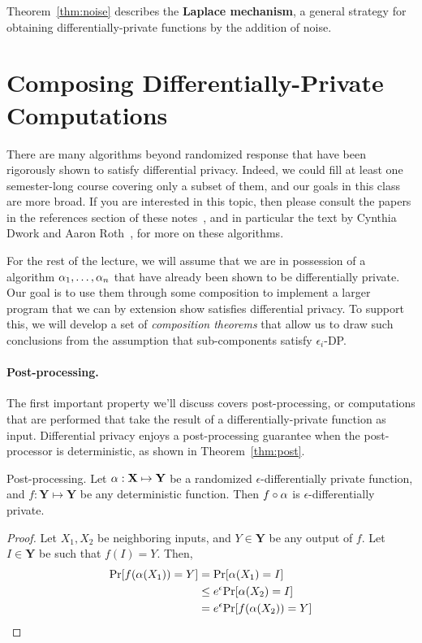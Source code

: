 \documentclass[11pt,twoside]{scrartcl}
\begin{document}
Theorem~\ref{thm:noise} describes the \textbf{Laplace mechanism}, a general strategy for obtaining differentially-private functions by the addition of noise.

\section{Composing Differentially-Private Computations}

There are many algorithms beyond randomized response that have been rigorously shown to satisfy differential privacy. Indeed, we could fill at least one semester-long course covering only a subset of them, and our goals in this class are more broad. If you are interested in this topic, then please consult the papers in the references section of these notes~\cite{Chaudhuri2011,ErlingssonKP14,McSherry2009}, and in particular the text by Cynthia Dwork and Aaron Roth~\cite{Dwork2014}, for more on these algorithms.

For the rest of the lecture, we will assume that we are in possession of a algorithm $\alpha_1, \ldots, \alpha_n$ that have already been shown to be differentially private. Our goal is to use them through some composition to implement a larger program that we can by extension show satisfies differential privacy. To support this, we will develop a set of \emph{composition theorems} that allow us to draw such conclusions from the assumption that sub-components satisfy $\epsilon_i$-DP.

\paragraph{Post-processing.} The first important property we'll discuss covers post-processing, or computations that are performed that take the result of a differentially-private function as input. Differential privacy enjoys a post-processing guarantee when the post-processor is deterministic, as shown in Theorem~\ref{thm:post}.

\begin{theorem}{Post-processing.}
\label{thm:post}
Let $\alpha : \mathbf{X} \mapsto \mathbf{Y}$ be a randomized $\epsilon$-differentially private function, and $f : \mathbf{Y} \mapsto \mathbf{Y}$ be any deterministic function. Then $f \circ \alpha$ is $\epsilon$-differentially private.
\end{theorem}

\begin{proof}
Let $X_1, X_2$ be neighboring inputs, and $Y \in \mathbf{Y}$ be any output of $f$. Let $I \in \mathbf{Y}$ be such that $f(I) = Y$. Then,
\begin{align*}
\mathrm{Pr}[f(\alpha(X_1)) = Y] &= \mathrm{Pr}[\alpha(X_1) = I] \\
&\le e^\epsilon\mathrm{Pr}[\alpha(X_2) = I] \\
&= e^\epsilon\mathrm{Pr}[f(\alpha(X_2)) = Y]
\end{align*}
\end{proof}
\end{document}
